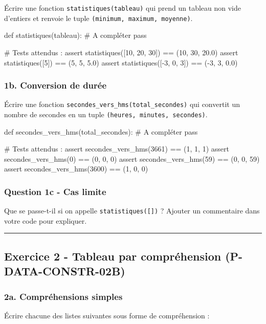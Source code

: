 Écrire une fonction \texttt{statistiques(tableau)} qui prend un tableau
non vide d'entiers et renvoie le tuple
\texttt{(minimum,\ maximum,\ moyenne)}.

\begin{python}
def statistiques(tableau):
    # A compléter
    pass

# Tests attendus :
assert statistiques([10, 20, 30]) == (10, 30, 20.0)
assert statistiques([5]) == (5, 5, 5.0)
assert statistiques([-3, 0, 3]) == (-3, 3, 0.0)
\end{python}

\subsubsection{1b. Conversion de durée}

Écrire une fonction \texttt{secondes\_vers\_hms(total\_secondes)} qui
convertit un nombre de secondes en un tuple
\texttt{(heures,\ minutes,\ secondes)}.

\begin{python}
def secondes_vers_hms(total_secondes):
    # A compléter
    pass

# Tests attendus :
assert secondes_vers_hms(3661) == (1, 1, 1)
assert secondes_vers_hms(0) == (0, 0, 0)
assert secondes_vers_hms(59) == (0, 0, 59)
assert secondes_vers_hms(3600) == (1, 0, 0)
\end{python}

\subsubsection{Question 1c - Cas limite}

Que se passe-t-il si on appelle \texttt{statistiques({[}{]})} ? Ajouter
un commentaire dans votre code pour expliquer.

\begin{center}\rule{0.5\linewidth}{0.5pt}\end{center}

\subsection{Exercice 2 - Tableau par compréhension (P-DATA-CONSTR-02B)}

\subsubsection{2a. Compréhensions simples}

Écrire chacune des listes suivantes sous forme de compréhension :

